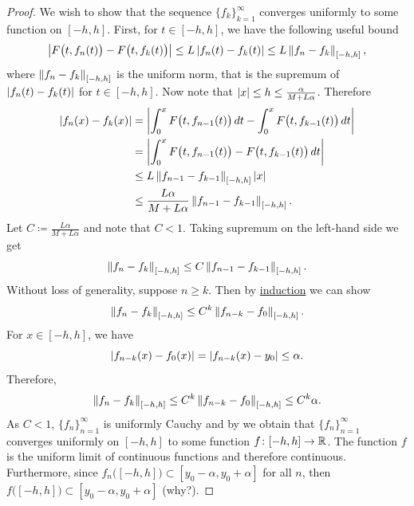 \begin{proof}
We wish to show that the sequence $\{ f_k \}_{k=1}^\infty$ converges uniformly
to some function on $[-h,h]$.  First, for $t \in [-h,h]$,
we have the following
useful bound
\begin{equation*}
\left\lvert {F\bigl(t,f_{n}(t)\bigr) - 
F\bigl(t,f_{k}(t)\bigr)} \right\rvert
\leq
L \left\lvert {f_n(t)-f_k(t)} \right\rvert
\leq
L \left\lVert {f_n-f_k} \right\rVert_{[-h,h]} ,
\end{equation*}
where $\left\lVert {f_n-f_k} \right\rVert_{[-h,h]}$ is the uniform norm, that
is the supremum of $\left\lvert {f_n(t)-f_k(t)} \right\rvert$ for $t \in [-h,h]$.
Now note that $\left\lvert {x} \right\rvert \leq h \leq \frac{\alpha}{M+L\alpha}$.
Therefore
\begin{equation*}
\begin{split}
\left\lvert {f_n(x) - f_k(x)} \right\rvert
& =
\left\lvert {\int_{0}^x F\bigl(t,f_{n-1}(t)\bigr)\,dt 
-
\int_{0}^x F\bigl(t,f_{k-1}(t)\bigr)\,dt} \right\rvert
\\
& =
\left\lvert {\int_{0}^x F\bigl(t,f_{n-1}(t)\bigr)-
F\bigl(t,f_{k-1}(t)\bigr)\,dt} \right\rvert
\\
& \leq
L\left\lVert {f_{n-1}-f_{k-1}} \right\rVert_{[-h,h]}
\left\lvert {x} \right\rvert
\\
& \leq
\frac{L\alpha}{M+L\alpha}
\left\lVert {f_{n-1}-f_{k-1}} \right\rVert_{[-h,h]} .
\end{split}
\end{equation*}
Let $C \coloneqq \frac{L\alpha}{M+L\alpha}$ and note that $C < 1$.
Taking supremum on the left-hand side we get
\begin{equation*}
\left\lVert {f_n-f_k} \right\rVert_{[-h,h]} \leq C \left\lVert {f_{n-1}-f_{k-1}} \right\rVert_{[-h,h]} .
\end{equation*}
Without loss of generality,
suppose $n \geq k$.  Then by \hyperref[induction:thm]{induction} we can show 
\begin{equation*}
\left\lVert {f_n-f_k} \right\rVert_{[-h,h]} \leq C^{k} \left\lVert {f_{n-k}-f_{0}} \right\rVert_{[-h,h]} .
\end{equation*}
For $x \in [-h,h]$, we have
\begin{equation*}
\left\lvert {f_{n-k}(x)-f_{0}(x)} \right\rvert
=
\left\lvert {f_{n-k}(x)-y_0} \right\rvert
\leq \alpha .
\end{equation*}
Therefore,
\begin{equation*}
\left\lVert {f_n-f_k} \right\rVert_{[-h,h]} \leq C^{k} \left\lVert {f_{n-k}-f_{0}} \right\rVert_{[-h,h]} \leq C^{k} \alpha .
\end{equation*}
As $C < 1$, $\{f_n\}_{n=1}^\infty$ is uniformly Cauchy and by
 we obtain that $\{ f_n \}_{n=1}^\infty$
converges uniformly on $[-h,h]$ to some function $f \colon [-h,h] \to {\mathbb{R}}$.
The function $f$ is the uniform limit of continuous functions and therefore
continuous.  Furthermore, since $f_n\bigl([-h,h]\bigr) \subset
[y_0-\alpha,y_0+\alpha]$ for all $n$,
then $f\bigl([-h,h]\bigr) \subset [y_0-\alpha,y_0+\alpha]$
(why?).



\end{proof}
